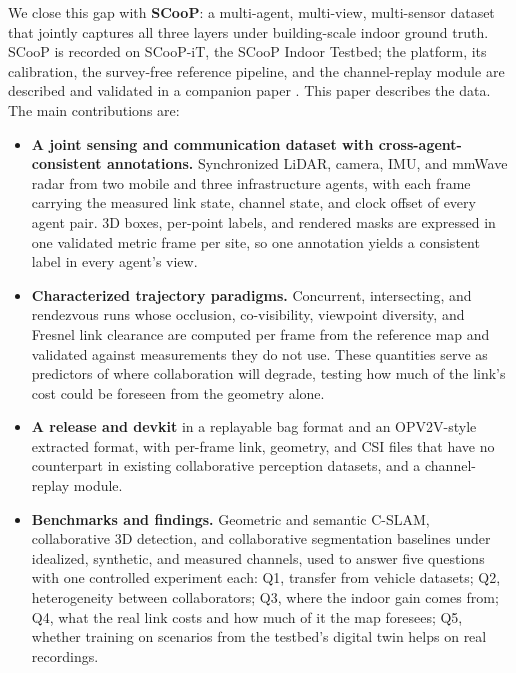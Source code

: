 \documentclass[journal]{IEEEtran}
\begin{document}
We close this gap with \textbf{SCooP}: a multi-agent, multi-view,
multi-sensor dataset that jointly captures all three layers under
building-scale indoor ground truth. SCooP is recorded on SCooP-iT, the SCooP Indoor Testbed; the
platform, its calibration, the survey-free reference pipeline, and the
channel-replay module are described and validated in a companion paper
\cite{scoop_testbed}. This paper describes the data.
The main contributions are:
\begin{itemize}
    \item \textbf{A joint sensing and communication dataset with
    cross-agent-consistent annotations.} Synchronized LiDAR, camera,
    IMU, and mmWave radar from two mobile and three infrastructure
    agents, with each frame carrying the measured link state, channel
    state, and clock offset of every agent pair. 3D boxes, per-point
    labels, and rendered masks are expressed in one validated metric
    frame per site, so one annotation yields a consistent label in
    every agent's view.
    \item \textbf{Characterized trajectory paradigms.} Concurrent,
    intersecting, and rendezvous runs whose occlusion, co-visibility,
    viewpoint diversity, and Fresnel link clearance are computed per
    frame from the reference map and validated against measurements
    they do not use. These quantities serve as predictors of where
    collaboration will degrade, testing how much of the link's cost
    could be foreseen from the geometry alone.
    \item \textbf{A release and devkit} in a replayable bag format and
    an OPV2V-style extracted format, with per-frame link, geometry,
    and CSI files that have no counterpart in existing collaborative
    perception datasets, and a channel-replay module.
    \item \textbf{Benchmarks and findings.} Geometric and semantic
    C-SLAM, collaborative 3D detection, and collaborative segmentation
    baselines under idealized, synthetic, and measured channels, used
    to answer five questions with one controlled experiment each: Q1,
    transfer from vehicle datasets; Q2, heterogeneity between
    collaborators; Q3, where the indoor gain comes from; Q4, what the
    real link costs and how much of it the map foresees; Q5, whether
    training on scenarios from the testbed's digital twin helps on real
    recordings.
\end{itemize}

\end{document}
